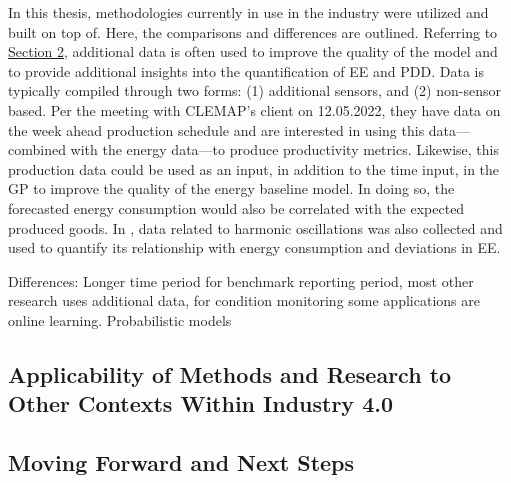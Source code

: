 In this thesis, methodologies currently in use in the industry were utilized and built on top of. Here, the comparisons and differences are outlined. Referring to \hyperlink{section.2}{Section 2}, additional data is often used to improve the quality of the model and to provide additional insights into the quantification of EE and PDD. Data is typically compiled through two forms: (1) additional sensors, and (2) non-sensor based. Per the meeting with CLEMAP's client on 12.05.2022, they have data on the week ahead production schedule and are interested in using this data—combined with the energy data—to produce productivity metrics. Likewise, this production data could be used as an input, in addition to the time input, in the GP to 
improve the quality of the energy baseline model. In doing so, the forecasted energy consumption would also be correlated with the expected produced goods. In \cite{HIPE} \cite{boiler} \cite{gas-turbine-faults}, data related to harmonic oscillations was also collected and used to quantify its relationship with energy consumption and deviations in EE. 


Differences: Longer time period for benchmark reporting period, most other research uses additional data, for condition monitoring some applications are online learning. Probabilistic models


\subsection{Applicability of Methods and Research to Other Contexts Within Industry 4.0}

\subsection{Moving Forward and Next Steps}